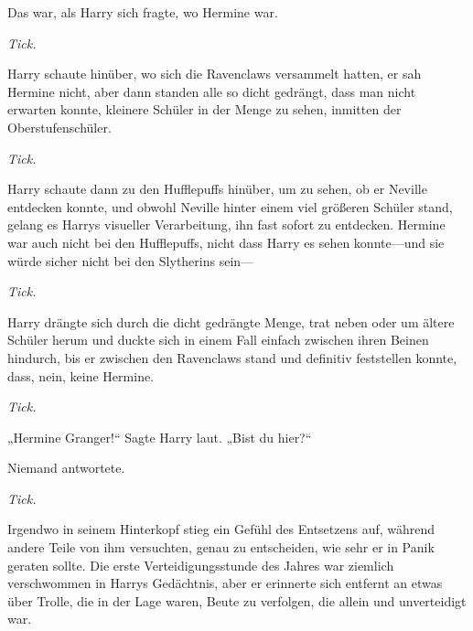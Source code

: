 Das war, als Harry sich fragte, wo Hermine war.

\emph{Tick.}

Harry schaute hinüber, wo sich die Ravenclaws versammelt hatten, er sah Hermine nicht, aber dann standen alle so dicht gedrängt, dass man nicht erwarten konnte, kleinere Schüler in der Menge zu sehen, inmitten der Oberstufenschüler.

\emph{Tick.}

Harry schaute dann zu den Hufflepuffs hinüber, um zu sehen, ob er Neville entdecken konnte, und obwohl Neville hinter einem viel größeren Schüler stand, gelang es Harrys visueller Verarbeitung, ihn fast sofort zu entdecken. Hermine war auch nicht bei den Hufflepuffs, nicht dass Harry es sehen konnte—und sie würde sicher nicht bei den Slytherins sein—

\emph{Tick.}

Harry drängte sich durch die dicht gedrängte Menge, trat neben oder um ältere Schüler herum und duckte sich in einem Fall einfach zwischen ihren Beinen hindurch, bis er zwischen den Ravenclaws stand und definitiv feststellen konnte, dass, nein, keine Hermine.

\emph{Tick.}

„Hermine Granger!“ Sagte Harry laut.
„Bist du hier?“

Niemand antwortete.

\emph{Tick.}

Irgendwo in seinem Hinterkopf stieg ein Gefühl des Entsetzens auf, während andere Teile von ihm versuchten, genau zu entscheiden, wie sehr er in Panik geraten sollte. Die erste Verteidigungsstunde des Jahres war ziemlich verschwommen in Harrys Gedächtnis, aber er erinnerte sich entfernt an etwas über Trolle, die in der Lage waren, Beute zu verfolgen, die allein und unverteidigt war.


